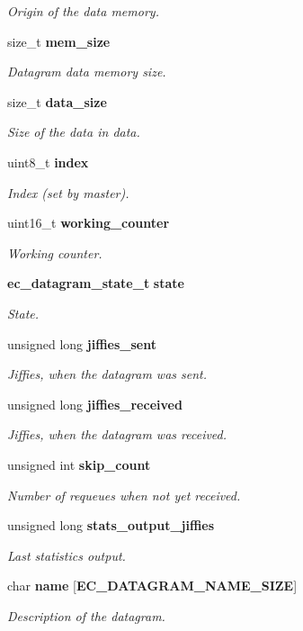 \begin{DoxyCompactItemize}
\begin{DoxyCompactList}\small\item\em \-Origin of the {\itshape data\/} memory. \end{DoxyCompactList}\item 
size\-\_\-t {\bf mem\-\_\-size}
\begin{DoxyCompactList}\small\item\em \-Datagram {\itshape data\/} memory size. \end{DoxyCompactList}\item 
size\-\_\-t {\bf data\-\_\-size}
\begin{DoxyCompactList}\small\item\em \-Size of the data in {\itshape data\/}. \end{DoxyCompactList}\item 
uint8\-\_\-t {\bf index}
\begin{DoxyCompactList}\small\item\em \-Index (set by master). \end{DoxyCompactList}\item 
uint16\-\_\-t {\bf working\-\_\-counter}
\begin{DoxyCompactList}\small\item\em \-Working counter. \end{DoxyCompactList}\item 
{\bf ec\-\_\-datagram\-\_\-state\-\_\-t} {\bf state}
\begin{DoxyCompactList}\small\item\em \-State. \end{DoxyCompactList}\item 
unsigned long {\bf jiffies\-\_\-sent}
\begin{DoxyCompactList}\small\item\em \-Jiffies, when the datagram was sent. \end{DoxyCompactList}\item 
unsigned long {\bf jiffies\-\_\-received}
\begin{DoxyCompactList}\small\item\em \-Jiffies, when the datagram was received. \end{DoxyCompactList}\item 
unsigned int {\bf skip\-\_\-count}
\begin{DoxyCompactList}\small\item\em \-Number of requeues when not yet received. \end{DoxyCompactList}\item 
unsigned long {\bf stats\-\_\-output\-\_\-jiffies}
\begin{DoxyCompactList}\small\item\em \-Last statistics output. \end{DoxyCompactList}\item 
char {\bf name} [{\bf \-E\-C\-\_\-\-D\-A\-T\-A\-G\-R\-A\-M\-\_\-\-N\-A\-M\-E\-\_\-\-S\-I\-Z\-E}]
\begin{DoxyCompactList}\small\item\em \-Description of the datagram. \end{DoxyCompactList}\end{DoxyCompactItemize}


